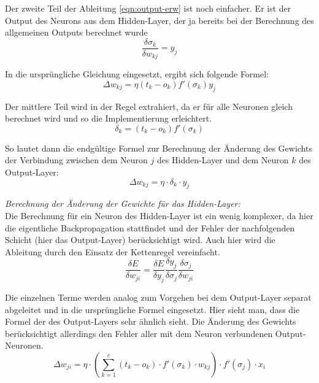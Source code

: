 Der zweite Teil der Ableitung \ref{eqn:output-erw} ist noch einfacher. Er ist der Output des Neurons aus dem Hidden-Layer, der ja bereits bei der Berechnung des allgemeinen Outputs berechnet wurde
\begin{equation}
\frac{\delta\sigma_k}{\delta w_{kj}}=y_j
\end{equation}

In die ursprüngliche Gleichung eingesetzt, ergibt sich folgende Formel:
\begin{equation}
\Delta w_{kj} = \eta (t_k - o_k) f'(\sigma_k)y_j
\end{equation}

Der mittlere Teil wird in der Regel extrahiert, da er für alle Neuronen gleich berechnet wird und so die Implementierung erleichtert.
\begin{equation}
\delta_k = (t_k - o_k) f'(\sigma_k)
\end{equation}

So lautet dann die endgültige Formel zur Berechnung der Änderung des Gewichts der Verbindung zwischen dem Neuron $j$ des Hidden-Layer und dem Neuron $k$ des Output-Layer:
\begin{equation}
\Delta w_{kj} = \eta\cdot \delta_k \cdot y_j
\end{equation}

\emph{Berechnung der Änderung der Gewichte für das Hidden-Layer:}
\\Die Berechnung für ein Neuron des Hidden-Layer ist ein wenig komplexer, da hier die eigentliche Backpropagation stattfindet und der Fehler der nachfolgenden Schicht (hier das Output-Layer) berücksichtigt wird. Auch hier wird die Ableitung durch den Einsatz der Kettenregel vereinfacht.
\begin{equation}
\frac{\delta E}{\delta w_{ji}} = \frac{\delta E}{\delta y_j} \frac{\delta y_j}{\delta\sigma_j}\frac{\delta\sigma_j}{\delta w_{ji}}
\end{equation}

Die einzelnen Terme werden analog zum Vorgehen bei dem Output-Layer separat abgeleitet und in die ursprüngliche Formel eingesetzt. Hier sieht man, dass die Formel der des Output-Layers sehr ähnlich sieht. Die Änderung des Gewichts berücksichtigt allerdings den Fehler aller mit dem Neuron verbundenen Output-Neuronen.
\begin{equation}
\Delta w_{ji} = \eta \cdot \left(\sum_{k=1}^{c}(t_k-o_k)\cdot f'(\sigma_k)\cdot w_{kj}\right) \cdot f'(\sigma_j) \cdot x_i
\end{equation}

